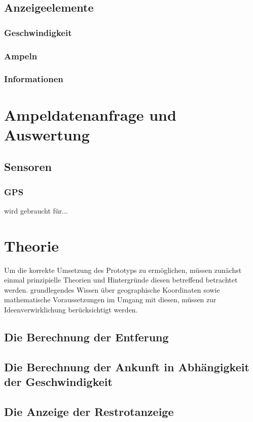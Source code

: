 \subsection{Anzeigeelemente}
\subsubsection{Geschwindigkeit}
\subsubsection{Ampeln}
\subsubsection{Informationen}
\section{Ampeldatenanfrage und Auswertung}
\subsection{Sensoren}
\subsubsection{GPS} wird gebraucht für...
\section{Theorie}
Um die korrekte Umsetzung des Prototyps zu ermöglichen, müssen zunächst einmal prinzipielle
Theorien und Hintergründe diesen betreffend betrachtet werden.
grundlegendes Wissen über geographische Koordinaten sowie mathematische Voraussetzungen im Umgang mit diesen, müssen zur Ideenverwirklichung berücksichtigt werden.
\subsection{Die Berechnung der Entferung}
\subsection{Die Berechnung der Ankunft in Abhängigkeit der Geschwindigkeit}
\subsection{Die Anzeige der Restrotanzeige}

